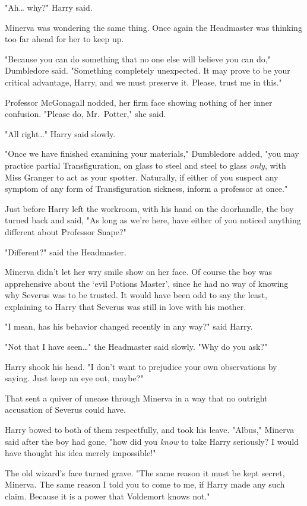 "Ah{\ldots} why?" Harry said.

Minerva was wondering the same thing. Once again the Headmaster was thinking 
too far ahead for her to keep up.

"Because you can do something that no one else will believe you can do," 
Dumbledore said. "Something completely unexpected. It may prove to be your 
critical advantage, Harry, and we must preserve it. Please, trust me in this."

Professor McGonagall nodded, her firm face showing nothing of her inner 
confusion. "Please do, Mr.~Potter," she said.

"All right{\ldots}" Harry said slowly.

"Once we have finished examining your materials," Dumbledore added, "you may 
practice partial Transfiguration, on glass to steel and steel to glass 
\emph{only}, with Miss Granger to act as your spotter. Naturally, if either of 
you suspect any symptom of any form of Transfiguration sickness, inform a 
professor at once."

Just before Harry left the workroom, with his hand on the doorhandle, the boy 
turned back and said, "As long as we're here, have either of you noticed 
anything different about Professor Snape?"

"Different?" said the Headmaster.

Minerva didn't let her wry smile show on her face. Of course the boy was 
apprehensive about the `evil Potions Master', since he had no way of knowing 
why Severus was to be trusted. It would have been odd to say the least, 
explaining to Harry that Severus was still in love with his mother.

"I mean, has his behavior changed recently in any way?" said Harry.

"Not that I have seen{\ldots}" the Headmaster said slowly. "Why do you ask?"

Harry shook his head. "I don't want to prejudice your own observations by 
saying. Just keep an eye out, maybe?"

That sent a quiver of unease through Minerva in a way that no outright 
accusation of Severus could have.

Harry bowed to both of them respectfully, and took his leave.
\sbreak
"Albus," Minerva said after the boy had gone, "how did you \emph{know} to take 
Harry seriously? I would have thought his idea merely impossible!"

The old wizard's face turned grave. "The same reason it must be kept secret, 
Minerva. The same reason I told you to come to me, if Harry made any such 
claim. Because it is a power that Voldemort knows not."

